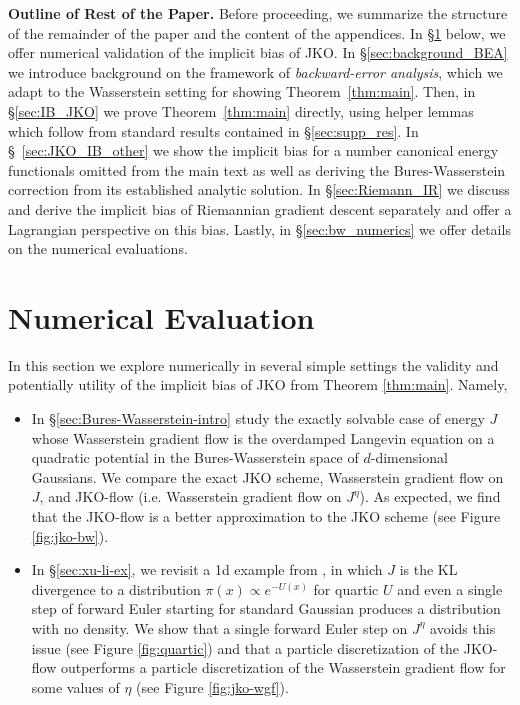 \documentclass[reqno,11pt,letterpaper]{amsart}
\theoremstyle{plain}
\theoremstyle{definition}
\theoremstyle{remark}
\begin{document}
\noindent \textbf{Outline of Rest of the Paper.} Before proceeding, we summarize the structure of the remainder of the paper and the content of the appendices. In \S \ref{sec:numerics} below, we offer numerical validation of the implicit bias of JKO. In \S \ref{sec:background_BEA} we introduce background on the framework of \emph{backward-error analysis}, which we adapt to the Wasserstein setting for showing Theorem~\ref{thm:main}. Then, in \S \ref{sec:IB_JKO} we prove Theorem~\ref{thm:main} directly, using helper lemmas which follow from standard results contained in \S \ref{sec:supp_res}. In \S ~\ref{sec:JKO_IB_other} we show the implicit bias for a number canonical energy functionals omitted from the main text as well as deriving the Bures-Wasserstein correction from its established analytic solution. In \S \ref{sec:Riemann_IR} we discuss and derive the implicit bias of Riemannian gradient descent separately and offer a Lagrangian perspective on this bias. Lastly, in \S \ref{sec:bw_numerics} we offer details on the numerical evaluations.

\section{Numerical Evaluation}\label{sec:numerics}
In this section we explore numerically in several simple settings the validity and potentially utility of the implicit bias of JKO from Theorem \ref{thm:main}. Namely, 
\begin{itemize}
    \item In \S \ref{sec:Bures-Wasserstein-intro} study the exactly solvable case of energy $J$ whose Wasserstein gradient flow is the overdamped Langevin equation on a quadratic potential in the Bures-Wasserstein space of $d$-dimensional Gaussians. We compare the exact JKO scheme, Wasserstein gradient flow on $J$, and JKO-flow (i.e. Wasserstein gradient flow on $J^\eta$). As expected, we find that the JKO-flow is a better approximation to the JKO scheme (see Figure \ref{fig:jko-bw}).
    \item In \S \ref{sec:xu-li-ex}, we revisit a 1d example from \cite{FE_Bad}, in which $J$ is the KL divergence to a distribution $\pi(x)\propto e^{-U(x)}$ for quartic $U$ and even a single step of forward Euler starting for standard Gaussian produces a distribution with no density. We show that a single forward Euler step on $J^\eta$ avoids this issue (see Figure \ref{fig:quartic}) and that a particle discretization of the JKO-flow outperforms a particle discretization of the Wasserstein gradient flow for some values of $\eta$ (see Figure \ref{fig:jko-wgf}). 
\end{itemize}
\end{document}
